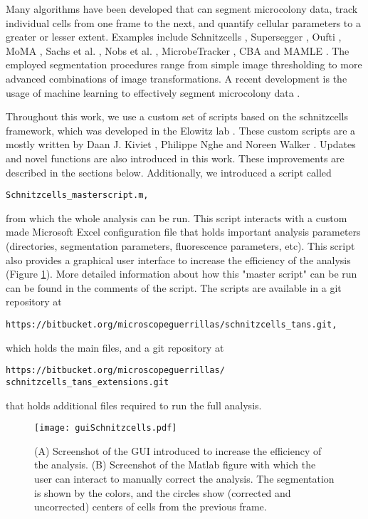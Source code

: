Many algorithms have been developed that can segment microcolony data, track individual cells from one frame to the next, and quantify cellular parameters to a greater or lesser extent. Examples include Schnitzcells \cite{Young2012, Kiviet2014}, Supersegger \cite{Stylianidou2016}, Oufti \cite{Paintdakhi2016}, MoMA \cite{Kaiser2016}, Sachs et al. \cite{Sachs2016}, Nobs et al. \cite{Nobs2014}, MicrobeTracker \cite{Sliusarenko2011, Ullman2013}, CBA \cite{Sadanandan2016} and MAMLE \cite{Chowdhury2013}. 
The employed segmentation procedures range from simple image thresholding to more advanced combinations of image transformations. 
A recent development is the usage of machine learning to effectively segment microcolony data \cite{VanValen2016}.

Throughout this work, we use a custom set of scripts based on the schnitzcells framework, which was developed in the Elowitz lab \cite{Young2012}. 
These custom scripts are a mostly written by Daan J. Kiviet \cite{Kiviet2010}, Philippe Nghe and Noreen Walker \cite{Walker2016t}.
Updates and novel functions are also introduced in this work.
These improvements are described in the sections below.
Additionally, we introduced a script called
\begin{verbatim}
Schnitzcells_masterscript.m,
\end{verbatim}
from which the whole analysis can be run. 
This script interacts with a custom made Microsoft Excel configuration file that holds important analysis parameters (directories, segmentation parameters, fluorescence parameters, etc).
This script also provides a graphical user interface to increase the efficiency of the analysis (Figure \ref{fig:mm:GUI}).
More detailed information about how this "master script" can be run can be found in the comments of the script.
The scripts are available in a git repository at 
\begin{verbatim}
https://bitbucket.org/microscopeguerrillas/schnitzcells_tans.git,
\end{verbatim}
which holds the main files, 
and a git repository at
\begin{verbatim}
https://bitbucket.org/microscopeguerrillas/
schnitzcells_tans_extensions.git
\end{verbatim}
that holds additional files required to run the full analysis.


\begin{figure}
	\centering
	\texttt{[image: guiSchnitzcells.pdf]}
	\caption{ 
		(A) Screenshot of the GUI introduced to increase the efficiency of the analysis.
		(B) Screenshot of the Matlab figure with which the user can interact to manually correct the analysis. The segmentation is shown by the colors, and the circles show (corrected and uncorrected) centers of cells from the previous frame.
	}
	\label{fig:mm:GUI}
\end{figure}

